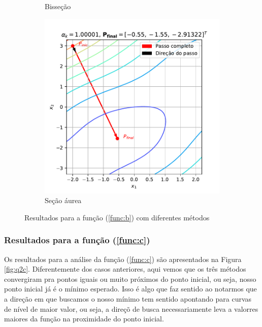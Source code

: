 \documentclass[10pt, a4paper]{article}
\begin{document}
\begin{figure}
\begin{subfigure}[b]{0.32\textwidth}
      \caption{Bisseção}
      \label{fig:q2b_2}
  \end{subfigure}
  \hfill
  \begin{subfigure}[b]{0.32\textwidth}
      \centering
      \includegraphics[width=\textwidth]{images/q2b_3.pdf}
      \caption{Seção áurea}
      \label{fig:q2b_3}
  \end{subfigure}
     \caption{Resultados para a função (\ref{func:b}) com diferentes métodos}
     \label{fig:q2b}
\end{figure}

\subsubsection{Resultados para a função (\ref{func:c})}

Os resultados para a análise da função (\ref{func:c}) são apresentados na Figura \ref{fig:q2c}. Diferentemente dos casos anteriores, aqui vemos
que os três métodos convergiram pra pontos iguais ou muito próximos do ponto inicial, ou seja, nosso ponto inicial já é o 
mínimo esperado. Isso é algo que faz sentido ao notarmos que a direção em que buscamos o nosso mínimo tem sentido apontando
para curvas de nível de maior valor, ou seja, a direçõ de busca necessariamente leva a valorres maiores da função na proximidade
do ponto inicial.
\end{document}
